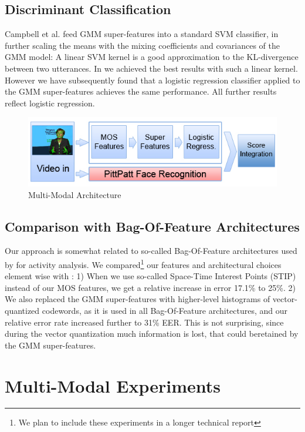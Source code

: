 \documentclass[times, 10pt,twocolumn]{article}
\begin{document}
\subsection{Discriminant Classification}
Campbell et al. \cite{Campbell06supportvector}  feed GMM super-features into a standard SVM classifier, in further scaling the means with the mixing coefficients and covariances of the GMM model:
A linear SVM kernel is a good approximation to the KL-divergence between two utterances.     In \cite{breglerICASSP09} we achieved the best results with such a linear kernel. However we have subsequently found that a logistic regression classifier applied to the GMM super-features achieves the same performance.  All further results reflect logistic regression.
\begin{figure}[bt]
\centering
\includegraphics[width=0.96\columnwidth]{fig_arch}
\caption{\label{fig_architecture} \small Multi-Modal Architecture}
\end{figure}


\subsection{Comparison with Bag-Of-Feature Architectures}
\label{sec_relatedbag}
Our approach is somewhat related to so-called Bag-Of-Feature architectures used by \cite{laptevCVPR08,niebles2008unsupervised,efros2003recognizing,DollarPETS05} for activity analysis.  We compared\footnote{We plan to include these experiments in a longer technical report} our features and architectural choices element wise with \cite{laptevCVPR08}: 1) When we use so-called Space-Time Interest Points (STIP) \cite{laptevCVPR08} instead of our MOS features, we get a relative increase in error 17.1\% to 25\%.  2) We also replaced the GMM super-features with higher-level histograms of vector-quantized codewords, as it is used in all Bag-Of-Feature architectures, and our relative error rate increased further  to 31\% EER.  This is not surprising, since during the vector quantization much information is lost, that could beretained by the GMM super-features.
\section{Multi-Modal Experiments}
\end{document}
